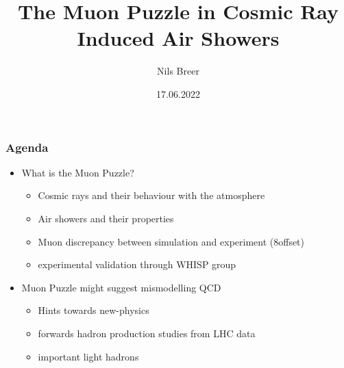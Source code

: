 \documentclass[aspectratio=1610, 9pt]{beamer}
\title{The Muon Puzzle in Cosmic Ray Induced Air Showers}
\author[N.Breer]{Nils Breer}
\institute{Fakultät Physik}
\date{17.06.2022}
\begin{document}
\maketitle

\begin{frame}\frametitle{Agenda}
  \begin{itemize}
    \item What is the Muon Puzzle?
    \begin{itemize}
      \item Cosmic rays and their behaviour with the atmosphere
      \item Air showers and their properties
      \item Muon discrepancy between simulation and experiment (8\sigma offset)
      \item experimental validation through WHISP group
    \end{itemize}
    \item Muon Puzzle might suggest mismodelling QCD
    \begin{itemize}
      \item Hints towards new-physics
      \item forwards hadron production studies from LHC data
      \item important light hadrons
    \end{itemize}
  \end{itemize}
\end{frame}

\end{document}
